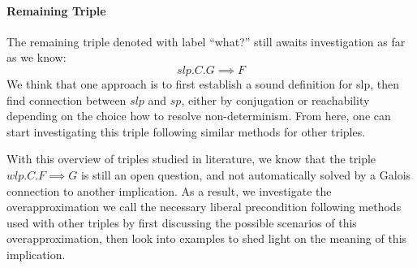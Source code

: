 \paragraph{Remaining Triple}
The remaining triple denoted with label ``what?'' still awaits investigation as far as we know: 
$$slp.C.G\implies F$$
We think that one approach is to first establish a sound definition for slp, then find connection between $slp$ and $sp$, either by conjugation or reachability depending on the choice how to resolve non-determinism. 
From here, one can start investigating this triple following similar methods for other triples. 

With this overview of triples studied in literature, we know that the triple $wlp.C.F\implies G$ is still an open question, and not automatically solved by a Galois connection to another implication. 
As a result, we investigate the overapproximation we call the necessary liberal precondition following methods used with other triples by first discussing the possible scenarios of this overapproximation, then look into examples to shed light on the meaning of this implication. 



